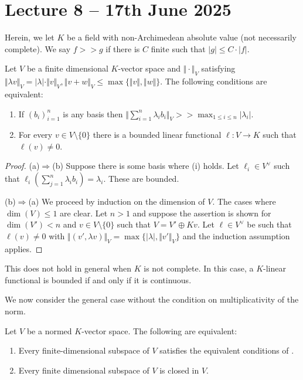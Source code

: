 \section{Lecture 8 -- 17th June 2025}\label{sec: lecture 5}
Herein, we let $K$ be a field with non-Archimedean absolute value (not necessarily complete). We say $f>>g$ if there is $C$ finite such that $|g|\leq C\cdot|f|$. 
\begin{proposition}\label{prop: equivalent conditions on vector spaces}
    Let $V$ be a finite dimensional $K$-vector space and $\Vert\cdot\Vert_{V}$ satisfying $\Vert \lambda v\Vert_{V}=|\lambda|\cdot\Vert v\Vert_{V}, \Vert v+w\Vert_{V}\leq\max\{\Vert v\Vert,\Vert w\Vert\}$. The following conditions are equivalent: 
    \begin{enumerate}[label=(\roman*)]
        \item If $(b_{i})_{i=1}^{n}$ is any basis then $\Vert\sum_{i=1}^{n}\lambda_{i}b_{i}\Vert_{V}>>\max_{1\leq i\leq n}|\lambda_{i}|$. 
        \item For every $v\in V\setminus\{0\}$ there is a bounded linear functional $\ell:V\to K$ such that $\ell(v)\neq0$. 
    \end{enumerate}
\end{proposition}
\begin{proof}
    (a)$\Rightarrow$(b) Suppose there is some basis where (i) holds. Let $\ell_{i}\in V^{\vee}$ such that $\ell_{i}\left(\sum_{j=1}^{n}\lambda_{i}b_{i}\right)=\lambda_{i}$. These are bounded. 

    (b)$\Rightarrow$(a) We proceed by induction on the dimension of $V$. The cases where $\dim(V)\leq 1$ are clear. Let $n>1$ and suppose the assertion is shown for $\dim(V')<n$ and $v\in V\setminus\{0\}$ such that $V=V'\oplus Kv$. Let $\ell\in V^{\vee}$ be such that $\ell(v)\neq0$ with $\Vert (v',\lambda v)\Vert_{V}=\max\{|\lambda|,\Vert v'\Vert_{V}\}$ and the induction assumption applies. 
\end{proof}
\begin{remark}
    This does not hold in general when $K$ is not complete. In this case, a $K$-linear functional is bounded if and only if it is continuous. 
\end{remark}
We now consider the general case without the condition on multiplicativity of the norm. 
\begin{proposition}\label{prop: finite subspace is closed}
    Let $V$ be a normed $K$-vector space. The following are equivalent:
    \begin{enumerate}[label=(\alph*)]
        \item Every finite-dimensional subspace of $V$ satisfies the equivalent conditions of . 
        \item Every finite dimensional subspace of $V$ is closed in $V$. 
    \end{enumerate}
\end{proposition}
